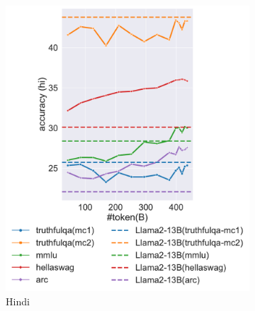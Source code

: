 \begin{figure}[t]
\begin{subfigure}{0.24\textwidth}
        \includegraphics[width=\textwidth]{fig/aurora-m-hi.pdf}
        \caption{Hindi}
        \label{fig:trend-hi}
    \end{subfigure}
    \begin{subfigure}{0.24\textwidth}
        \centering

\end{subfigure}
\end{figure}
